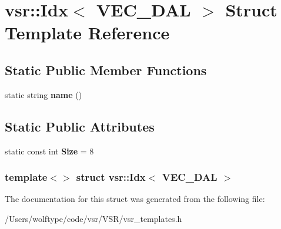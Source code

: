 \hypertarget{structvsr_1_1_idx_3_01_v_e_c___d_a_l_01_4}{\section{vsr\-:\-:Idx$<$ V\-E\-C\-\_\-\-D\-A\-L $>$ Struct Template Reference}
\label{structvsr_1_1_idx_3_01_v_e_c___d_a_l_01_4}
}
\subsection*{Static Public Member Functions}
\begin{DoxyCompactItemize}
\item 
\hypertarget{structvsr_1_1_idx_3_01_v_e_c___d_a_l_01_4_ae3766076be3df21302a6836a7e98efaa}{static string {\bfseries name} ()}\label{structvsr_1_1_idx_3_01_v_e_c___d_a_l_01_4_ae3766076be3df21302a6836a7e98efaa}

\end{DoxyCompactItemize}
\subsection*{Static Public Attributes}
\begin{DoxyCompactItemize}
\item 
\hypertarget{structvsr_1_1_idx_3_01_v_e_c___d_a_l_01_4_a7d6934ffdcae9d9562ef4d9b1149168c}{static const int {\bfseries Size} = 8}\label{structvsr_1_1_idx_3_01_v_e_c___d_a_l_01_4_a7d6934ffdcae9d9562ef4d9b1149168c}

\end{DoxyCompactItemize}
\subsubsection*{template$<$$>$ struct vsr\-::\-Idx$<$ V\-E\-C\-\_\-\-D\-A\-L $>$}



The documentation for this struct was generated from the following file\-:\begin{DoxyCompactItemize}
\item 
/\-Users/wolftype/code/vsr/\-V\-S\-R/vsr\-\_\-templates.\-h\end{DoxyCompactItemize}
